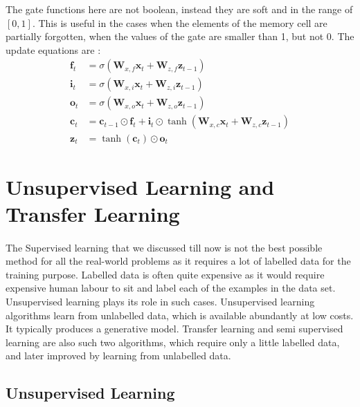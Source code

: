 \documentclass{article}
\begin{document}
    The gate functions here are not boolean, instead they are soft and in the range of $[0,1]$. This is useful in the cases when the elements of the memory cell are partially forgotten, when the values of the gate are smaller than 1, but not 0. The update equations are :
    \begin{align*}
      \mathbf{f}_t &= \sigma(\mathbf{W}_{x,f} \mathbf{x}_t + \mathbf{W}_{z,f} \mathbf{z}_{t-1}) \\
      \mathbf{i}_t &= \sigma(\mathbf{W}_{x,i} \mathbf{x}_t + \mathbf{W}_{z,i} \mathbf{z}_{t-1}) \\
      \mathbf{o}_t &= \sigma(\mathbf{W}_{x,o} \mathbf{x}_t + \mathbf{W}_{z,o} \mathbf{z}_{t-1}) \\
      \mathbf{c}_t &= \mathbf{c}_{t-1} \odot \mathbf{f}_t + \mathbf{i}_t \odot \tanh(\mathbf{W}_{x,c} \mathbf{x}_t + \mathbf{W}_{z,c} \mathbf{z}_{t-1}) \\
      \mathbf{z}_t &= \tanh(\mathbf{c}_t) \odot \mathbf{o}_t
      \end{align*}



\section{Unsupervised Learning and Transfer Learning}
  \paragraph{} The Supervised learning that we discussed till now is not the best possible method for all the real-world problems as it requires a lot of labelled data for the training purpose. Labelled data is often quite expensive as it would require expensive human labour to sit and label each of the examples in the data set. Unsupervised learning plays its role in such cases. Unsupervised learning algorithms learn from unlabelled data, which is available abundantly at low costs. It typically produces a generative model. Transfer learning and semi supervised learning are also such two algorithms, which require only a little labelled data, and later improved by learning from unlabelled data.
  \subsection{Unsupervised Learning}
\end{document}
